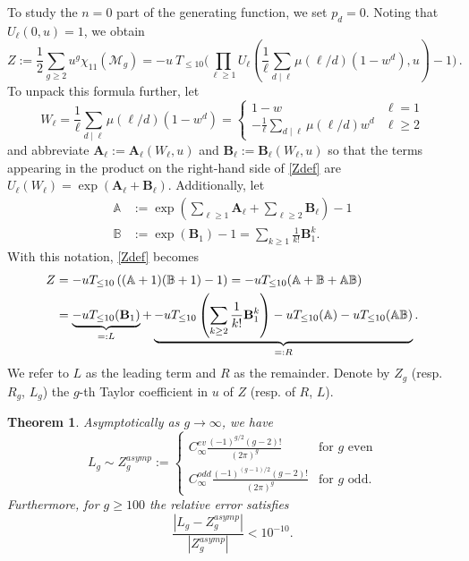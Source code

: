 \documentclass[12pt]{amsart}
\newtheorem{thm}{Theorem}[section]
\theoremstyle{definition}
\numberwithin{equation}{section}
\newcommand{\M}{\mathcal{M}}
\newcommand{\bA}{\mathbf{A}}
\newcommand{\bB}{\mathbf{B}}
\theoremstyle{definition} %
\theoremstyle{remark}
\begin{document}
To study the $n=0$ part of the generating function, we set $p_d=0$. Noting that $U_\ell(0, u)=1$, we obtain
\begin{equation} \label{Zdef}
    Z:= \frac12 \sum_{g\geq 2} u^{g} \chi_{11}(\M_{g})
      =
      -u\  T_{\leq 10}\bigg(
      \prod_{\ell\geq 1} 
        U_\ell(\frac 1 \ell \sum_{d\mid \ell} \mu(\ell/d) (1-w^d ), u )
-1\bigg)\, .
\end{equation}
To unpack this formula further, let
\[
W_{\ell} = 
\frac 1 \ell \sum_{d\mid \ell} \mu(\ell/d) (1-w^d )
=
\begin{cases}
1-w & \text{$\ell=1$} \\
-\frac 1 \ell \sum_{d\mid \ell} \mu(\ell/d) w^d & \text{$\ell\geq 2$}
\end{cases}
\]
and abbreviate $\mathbf{A}_\ell := \mathbf{A}_\ell(W_\ell,u)$ and $\mathbf{B}_\ell := \mathbf{B}_\ell(W_\ell,u)$ so that the terms appearing in the product on the right-hand side of  \eqref{Zdef} are $U_\ell(W_\ell) = \exp(\mathbf{A}_\ell + \mathbf{B}_\ell)$.
Additionally, let
\begin{align}
\label{bbAdef}    \mathbb{A} &:= \exp\left(\sum_{\ell \geq 1} \bA_\ell+ \sum_{\ell \geq 2} \bB_\ell\right) -1
   \\
\label{bbBdef}    \mathbb{B}&:= \exp(\mathbf{B}_1) -1 = \sum_{k\geq 1}\frac 1 {k!} \bB_1^k.
\end{align}
With this notation, \eqref{Zdef} becomes
\begin{align} \notag Z &= -u T_{\leq 10}\left((\mathbb{A} + 1)(\mathbb{B} + 1) - 1 \right) 
= -u T_{\leq 10}(\mathbb{A} + \mathbb{B} + \mathbb{A}\mathbb{B}) \\
&=  \underbrace{-uT_{\leq 10}(\mathbf{B}_1)}_{=:L} + \underbrace{-u T_{\leq 10} \left(\sum_{k \geq 2} \frac{1}{k!} \mathbf{B}_1^k \right) - uT_{\leq 10}(\mathbb{A})- uT_{\leq 10}(\mathbb{A}\mathbb{B})}_{=:R}. \label{4terms}
\end{align}
We refer to $L$ as the leading term and $R$ as the remainder.
Denote by $Z_g$ (resp. $R_g$, $L_g$) the $g$-th Taylor coefficient in $u$ of $Z$ (resp. of $R$, $L$).

\begin{thm}\label{thm:lead}
    Asymptotically as $g\to \infty$, we have
\[
L_g \sim 
Z_g^{asymp}:=
\begin{cases}
    C_\infty^{ev} \frac{(-1)^{g/2} (g-2)! }{(2\pi)^g } & \text{for $g$ even} \\
    C_\infty^{odd} \frac{(-1)^{(g-1)/2} (g-2)! }{(2\pi)^{g} }
     & \text{for $g$ odd.} 
\end{cases}
\]
Furthermore, for $g\geq 100$ the relative error satisfies 
\[
    \frac{|L_g-Z_g^{asymp}|}{|Z_g^{asymp}|}<10^{-10}.
\]
\end{thm}
\end{document}
